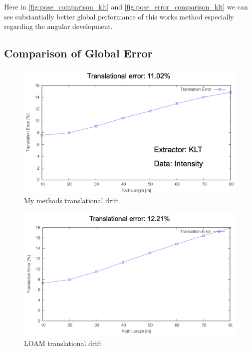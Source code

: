 {{{        Here in \cref{fig:pose_comparison_klt} and \cref{fig:pose_error_comparison_klt} we can see substantially better global performance of this works method especially regarding the angular development.

    }

    \subsection{Comparison of Global Error}{
        \begin{figure}[ht]
            \centering
            \includegraphics[scale = 0.45]{images/results/mm_drift_translation.png}
            \caption{My methods translational drift}
            \label{fig:mm_drift_transl_klt}
        \end{figure}
        
        \begin{figure}[ht]
            \centering
            \includegraphics[scale = 0.4]{images/results/loam_drift_transl.png}
            \caption{LOAM translational drift}
            \label{fig:loam_drift_transl_klt}
        \end{figure}
        
}}}
